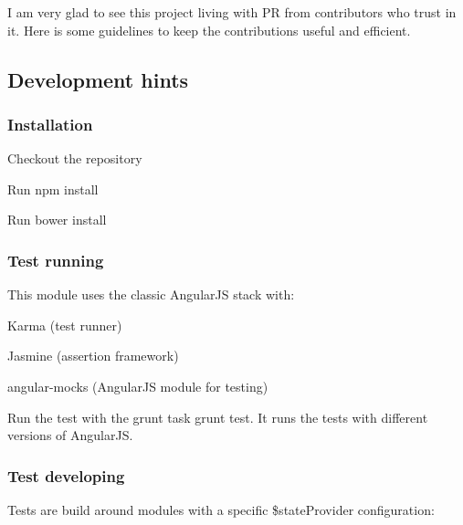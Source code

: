 I am very glad to see this project living with PR from contributors who trust in it. Here is some guidelines to keep the contributions useful and efficient.

\subsection*{Development hints}

\subsubsection*{Installation}


\begin{DoxyItemize}
\item Checkout the repository
\item Run {\ttfamily npm install}
\item Run {\ttfamily bower install}
\end{DoxyItemize}

\subsubsection*{Test running}

This module uses the classic Angular\+JS stack with\+:


\begin{DoxyItemize}
\item Karma (test runner)
\item Jasmine (assertion framework)
\item angular-\/mocks (Angular\+JS module for testing)
\end{DoxyItemize}

Run the test with the grunt task {\ttfamily grunt test}. It runs the tests with different versions of Angular\+JS.

\subsubsection*{Test developing}

Tests are build around modules with a specific {\ttfamily \$state\+Provider} configuration\+:


